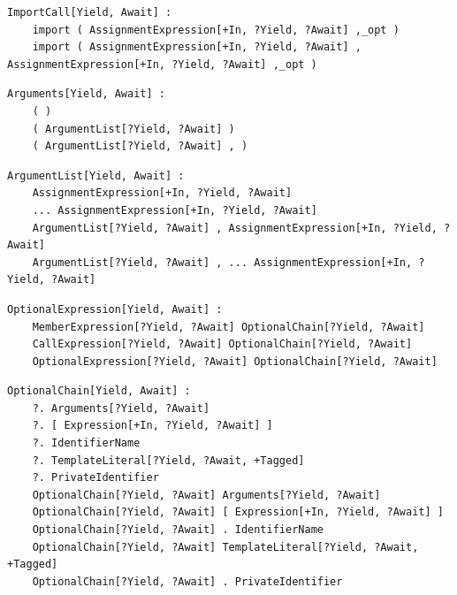 \noindent\textbf{\texttt{}}\par
\begin{lstlisting}
ImportCall[Yield, Await] :
    import ( AssignmentExpression[+In, ?Yield, ?Await] ,_opt )
    import ( AssignmentExpression[+In, ?Yield, ?Await] , AssignmentExpression[+In, ?Yield, ?Await] ,_opt )
\end{lstlisting}

\noindent\textbf{\texttt{}}\par
\begin{lstlisting}
Arguments[Yield, Await] :
    ( )
    ( ArgumentList[?Yield, ?Await] )
    ( ArgumentList[?Yield, ?Await] , )
\end{lstlisting}

\noindent\textbf{\texttt{}}\par
\begin{lstlisting}
ArgumentList[Yield, Await] :
    AssignmentExpression[+In, ?Yield, ?Await]
    ... AssignmentExpression[+In, ?Yield, ?Await]
    ArgumentList[?Yield, ?Await] , AssignmentExpression[+In, ?Yield, ?Await]
    ArgumentList[?Yield, ?Await] , ... AssignmentExpression[+In, ?Yield, ?Await]
\end{lstlisting}

\noindent\textbf{\texttt{}}\par
\begin{lstlisting}
OptionalExpression[Yield, Await] :
    MemberExpression[?Yield, ?Await] OptionalChain[?Yield, ?Await]
    CallExpression[?Yield, ?Await] OptionalChain[?Yield, ?Await]
    OptionalExpression[?Yield, ?Await] OptionalChain[?Yield, ?Await]
\end{lstlisting}

\noindent\textbf{\texttt{}}\par
\begin{lstlisting}
OptionalChain[Yield, Await] :
    ?. Arguments[?Yield, ?Await]
    ?. [ Expression[+In, ?Yield, ?Await] ]
    ?. IdentifierName
    ?. TemplateLiteral[?Yield, ?Await, +Tagged]
    ?. PrivateIdentifier
    OptionalChain[?Yield, ?Await] Arguments[?Yield, ?Await]
    OptionalChain[?Yield, ?Await] [ Expression[+In, ?Yield, ?Await] ]
    OptionalChain[?Yield, ?Await] . IdentifierName
    OptionalChain[?Yield, ?Await] TemplateLiteral[?Yield, ?Await, +Tagged]
    OptionalChain[?Yield, ?Await] . PrivateIdentifier
\end{lstlisting}

